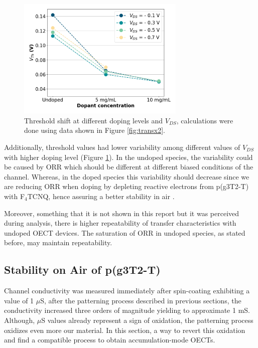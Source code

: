 \begin{figure}[ht]
  \centering
  \includegraphics[width=8cm]{Images/pdf/vth_shift_vds.pdf}
  \caption[Threshold shift at different doping levels and $V_{DS}$]{Threshold shift at different doping levels and $V_{DS}$, calculations were done using data shown in Figure \ref{fig:transx2}.}
  \label{fig:vth_vds}
\end{figure}

Additionally, threshold values had lower variability among different values of $V_{DS}$ with higher doping level (Figure \ref{fig:vth_vds}). In the undoped species, the variability could be caused by ORR which should be different at different biased conditions of the channel. Whereas, in the doped species this variability should decrease since we are reducing ORR when doping by depleting reactive electrons from p(g3T2-T) with F$_{4}$TCNQ, hence assuring a better stability in air \cite{tanTuningOrganicElectrochemical2022}. %

Moreover, something that it is not shown in this report but it was perceived during analysis, there is higher repeatability of transfer characteristics with undoped OECT devices. The saturation of ORR in undoped species, as stated before, may maintain repeatability. %


\subsection{Stability on Air of p(g3T2-T)}
Channel conductivity was measured immediately after spin-coating exhibiting a value of 1 $\mu$S, after the patterning process described in previous sections, the conductivity increased three orders of magnitude yielding to approximate 1 mS. Although, $\mu$S values already represent a sign of oxidation, the patterning process oxidizes even more our material. In this section, a way to revert this oxidation and find a compatible process to obtain accumulation-mode OECTs.

